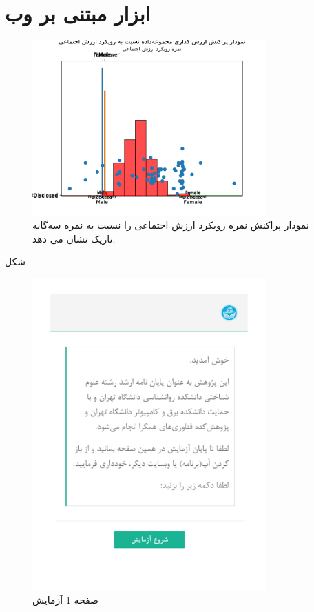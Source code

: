 \chapter{ابزار مبتنی بر وب}
\begin{figure}[htpb]
    \centering
    \includegraphics[width=0.8\textwidth]{./img/ScatterSVOScoreDarkTriadScore.pdf}
    \caption{نمودار پراکنش نمره رویکرد ارزش اجتماعی را نسبت به نمره سه‌گانه تاریک نشان می دهد. }
    \label{fig:ScatterSVOScoreDarkTriadScore}
\end{figure}
شکل 
\label{fig:sexualityAndSVOAgainstPopulation}



\begin{figure}[htpb]
    \centering
    \includegraphics[width=0.8\textwidth]{./img/Task1.png}
    \caption{ صفحه 1 آزمایش }
    \label{fig:Task1}
\end{figure}


